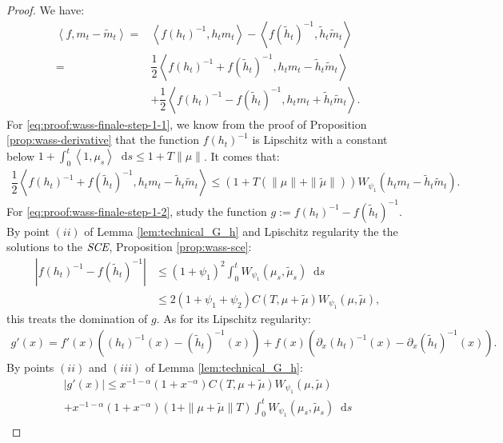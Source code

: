 \documentclass[11pt,a4paper]{article}
\newcommand{\SCE}{\emph{SCE}}
\newcommand{\brac}[1]{\left\langle#1\right\rangle}
\newcommand{\dd}{\mathop{}\!\mathrm{d}}
\begin{document}
\begin{proof}
    We have:
    \begin{subequations}
    \begin{align}
        \brac{f,m_t-\tilde{m}_t} 
        =& \brac{f(h_t)^{-1}, h_t m_t} - \brac{f(\tilde{h}_t)^{-1},\tilde{h}_t\tilde{m}_t}\nonumber \\
        =& \dfrac12\brac{f(h_t)^{-1} + f(\tilde{h}_t)^{-1}  ,h_tm_t - \tilde{h}_t\tilde{m}_t} \label{eq:proof:wass-finale-step-1-1} \\
        &+ \dfrac12\brac{f(h_t)^{-1} - f(\tilde{h}_t)^{-1},h_t m_t + \tilde{h}_t\tilde{m}_t} \label{eq:proof:wass-finale-step-1-2} .
    \end{align}
    \end{subequations}
    For \eqref{eq:proof:wass-finale-step-1-1}, we know from the proof of Proposition \ref{prop:wass-derivative} that the function $f(h_t)^{-1}$ is Lipschitz with a constant below $1 + \int_0^t \brac{1,\mu_s} \dd s \leq 1 + T\|\mu\|$. It comes that:
    \begin{align*}
        \dfrac12\brac{f(h_t)^{-1} + f(\tilde{h}_t)^{-1}  ,h_tm_t - \tilde{h}_t\tilde{m}_t}
        \leq\left( 1 + T\left(\|\mu\| + \|\tilde{\mu}\|\right)\right)W_{\psi_1}(h_tm_t - \tilde{h}_t\tilde{m}_t).
    \end{align*}
    For \eqref{eq:proof:wass-finale-step-1-2}, study the function $g:= f(h_t)^{-1} - f(\tilde{h}_t)^{-1}$. By point $(ii)$ of Lemma \ref{lem:technical_G_h} and Lpischitz regularity the the solutions to the $\SCE$, Proposition \ref{prop:wass-sce}:
    \begin{align*}
        \left| f(h_t)^{-1} - f(\tilde{h}_t)^{-1}\right|
        &\leq (1 + \psi_1)^2 \int_0^t W_{\psi_1}(\mu_s,\tilde{\mu}_s) \dd s \\
        &\leq 2\left( 1 + \psi_1 + \psi_2\right) C(T,\mu + \tilde{\mu})W_{\psi_1}(\mu,\tilde{\mu}),
    \end{align*}
    this treats the domination of $g$. As for its Lipschitz regularity:
    \begin{align*}
        g'(x) = f'(x) \left((h_t)^{-1}(x) - (\tilde{h}_t)^{-1}(x)\right) + f(x) \left(\partial_x(h_t)^{-1}(x) - \partial_x(\tilde{h}_t)^{-1}(x)\right).
    \end{align*}
    By points $(ii)$ and $(iii)$ of Lemma \ref{lem:technical_G_h}:
    \begin{multline*}
        \left| g'(x) \right| \leq x^{-1-\alpha} \left(1 + x^{-\alpha} \right) C(T,\mu + \tilde{\mu})W_{\psi_1}(\mu,\tilde{\mu}) \\
        +
        x^{-1-\alpha} \left(1 + x^{-\alpha} \right) \left(1 + \|\mu + \tilde{\mu}\|T\right) \int_0^t W_{\psi_1}(\mu_s,\tilde{\mu}_s) \dd s \\

\end{multline*}
\end{proof}
\end{document}
